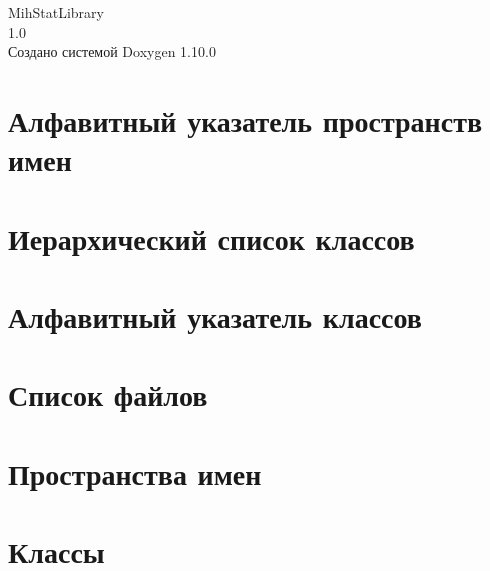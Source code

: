 \documentclass[twoside]{book}
\newcommand{\+}{\discretionary{\mbox{\scriptsize$\hookleftarrow$}}{}{}}
\newcommand{\clearemptydoublepage}{%
    \newpage{\pagestyle{empty}\cleardoublepage}%
  }
\begin{document}
  \raggedbottom
  \begin{titlepage}
  \vspace*{7cm}
  \begin{center}%
  {\Large Mih\+Stat\+Library}\\
  [1ex]\large 1.\+0 \\
  \vspace*{1cm}
  {\large Создано системой Doxygen 1.10.0}\\
  \end{center}
  \end{titlepage}
  \clearemptydoublepage
  \tableofcontents
  \clearemptydoublepage
\chapter{Алфавитный указатель пространств имен}

\chapter{Иерархический список классов}

\chapter{Алфавитный указатель классов}

\chapter{Список файлов}

\chapter{Пространства имен}




\chapter{Классы}











\end{document}
